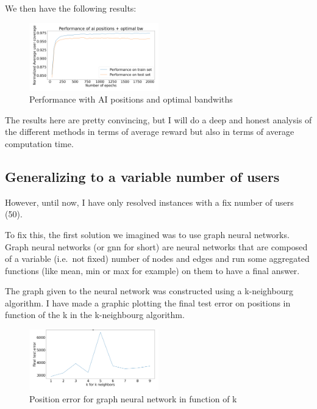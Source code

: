 \documentclass[letterpaper]{article}
\begin{document}
We then have the following results:

\begin{figure}[H]
    \centering
    \includegraphics[width=0.5\textwidth]{images/mix_results.png}
    \caption{Performance with AI positions and optimal bandwiths}
\end{figure}

The results here are pretty convincing, but I will do a deep and honest analysis of the different methods in terms
of average reward but also in terms of average computation time.

\subsection{Generalizing to a variable number of users}

However, until now, I have only resolved instances with a fix number of users (50).

To fix this, the first solution we imagined was to use graph neural networks.
Graph neural networks (or gnn for short) are neural networks that are composed of a variable (i.e.\, not fixed) number
of nodes and edges and run some aggregated functions (like mean, min or max for example) on them to have a final answer.

The graph given to the neural network was constructed using a k-neighbourg algorithm.
I have made a graphic plotting the final test error on positions in function of the k in the k-neighbourg algorithm.

\begin{figure}[H]
    \centering
    \includegraphics[width=0.5\textwidth]{images/knn_for_gnn.png}
    \caption{Position error for graph neural network in function of k}
\end{figure}
\end{document}
